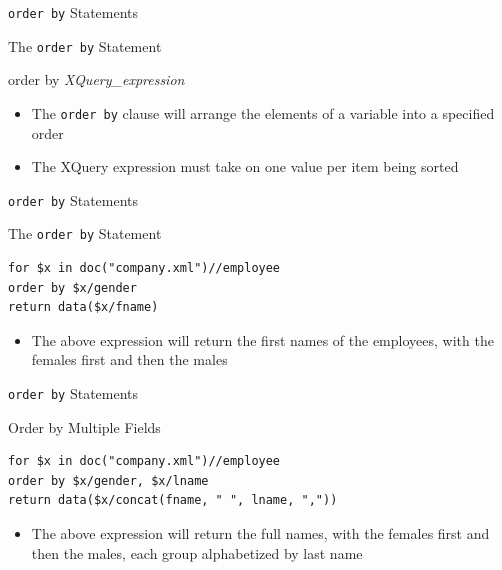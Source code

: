 \documentclass[svgnames]{beamer}
\begin{document}

\begin{frame}[fragile]{\texttt{order by} Statements}
\small
\begin{block}{The \texttt{order by} Statement}
\begin{semiverbatim}
order by \textit{XQuery\_expression}
\end{semiverbatim}
\end{block}
\normalsize
\begin{itemize}
	\item The \texttt{order by} clause will arrange the elements of a variable into a specified order
	\item The XQuery expression must take on one value per item being sorted
\end{itemize}
\end{frame}

\begin{frame}[fragile]{\texttt{order by} Statements}
\small
\begin{block}{The \texttt{order by} Statement}
\begin{verbatim}
for $x in doc("company.xml")//employee
order by $x/gender
return data($x/fname)
\end{verbatim}
\end{block}
\normalsize
\begin{itemize}
	\item The above expression will return the first names of the employees, with the females first and then the males
\end{itemize}
\end{frame}

\begin{frame}[fragile]{\texttt{order by} Statements}
\small
\begin{block}{Order by Multiple Fields}
\begin{verbatim}
for $x in doc("company.xml")//employee
order by $x/gender, $x/lname
return data($x/concat(fname, " ", lname, ","))
\end{verbatim}
\end{block}
\normalsize
\begin{itemize}
	\item The above expression will return the full names, with the females first and then the males, each group alphabetized by last name
\end{itemize}
\end{frame}
\end{document}

